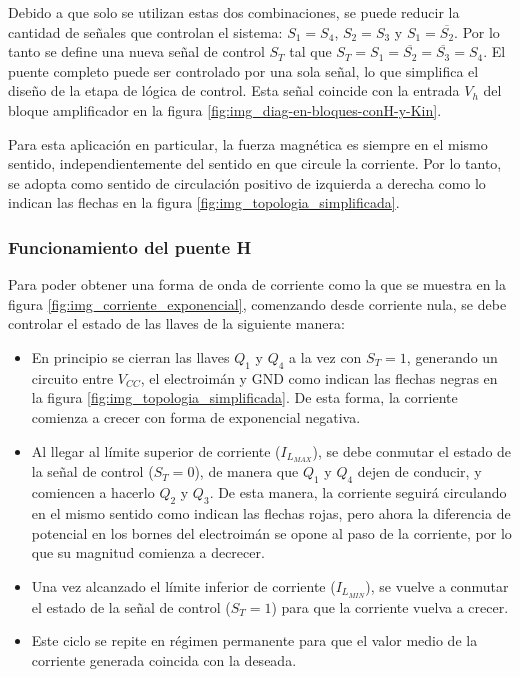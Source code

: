 Debido a que solo se utilizan estas dos combinaciones, se puede reducir la cantidad de señales que controlan el sistema: $S_1=S_4$, $S_2=S_3$ y $S_1=\overline{S_2}$. Por lo tanto se define una nueva señal de control $S_T$ tal que $S_T=S_1=\overline{S_2}=\overline{S_3}=S_4$. El puente completo puede ser controlado por una sola señal, lo que simplifica el diseño de la etapa de lógica de control. Esta señal coincide con la entrada $V_h$ del bloque amplificador en la figura \ref{fig:img_diag-en-bloques-conH-y-Kin}.

Para esta aplicación en particular, la fuerza magnética es siempre en el mismo sentido, independientemente del sentido en que circule la corriente. Por lo tanto, se adopta como sentido de circulación positivo de izquierda a derecha como lo indican las flechas en la figura \ref{fig:img_topologia_simplificada}. 



\subsubsection{Funcionamiento del puente H}

Para poder obtener una forma de onda de corriente como la que se muestra en la figura \ref{fig:img_corriente_exponencial}, comenzando desde corriente nula, se debe controlar el estado de las llaves de la siguiente manera:


\begin{itemize}
	\item En principio se cierran las llaves $Q_1$ y $Q_4$ a la vez con $S_T=1$, generando un circuito entre $V_{CC}$, el electroimán y GND como indican las flechas negras en la figura \ref{fig:img_topologia_simplificada}. De esta forma, la corriente comienza a crecer con forma de exponencial negativa.
	\item Al llegar al límite superior de corriente ($I_{L_{MAX}}$), se debe conmutar el estado de la señal de control ($S_T=0$), de manera que $Q_1$ y $Q_4$ dejen de conducir, y comiencen a hacerlo $Q_2$ y $Q_3$. De esta manera, la corriente seguirá circulando en el mismo sentido como indican las flechas rojas, pero ahora la diferencia de potencial en los bornes del electroimán se opone al paso de la corriente, por lo que su magnitud comienza a decrecer.
	\item Una vez alcanzado el límite inferior de corriente ($I_{L_{MIN}}$), se vuelve a conmutar el estado de la señal de control ($S_T=1$) para que la corriente vuelva a crecer.
	\item Este ciclo se repite en régimen permanente para que el valor medio de la corriente generada coincida con la deseada. 
\end{itemize}

